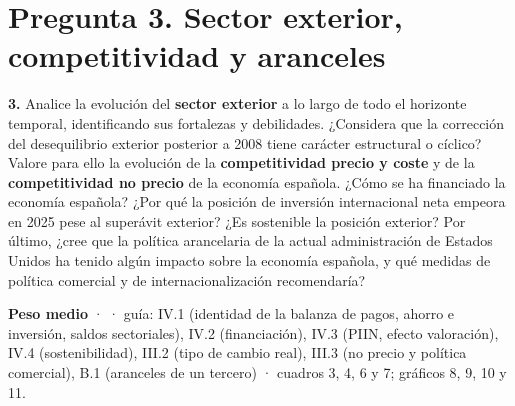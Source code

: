 \clearpage
\section*{Pregunta 3. Sector exterior, competitividad y aranceles}

\begin{enunciado}
\textbf{3.} Analice la evolución del \textbf{sector exterior} a lo largo de todo el horizonte temporal, identificando sus fortalezas y debilidades. ¿Considera que la corrección del desequilibrio exterior posterior a 2008 tiene carácter estructural o cíclico? Valore para ello la evolución de la \textbf{competitividad precio y coste} y de la \textbf{competitividad no precio} de la economía española. ¿Cómo se ha financiado la economía española? ¿Por qué la posición de inversión internacional neta empeora en 2025 pese al superávit exterior? ¿Es sostenible la posición exterior? Por último, ¿cree que la política arancelaria de la actual administración de Estados Unidos ha tenido algún impacto sobre la economía española, y qué medidas de política comercial y de internacionalización recomendaría?

\smallskip
\textbf{Peso medio} ·  · guía: IV.1 (identidad de la balanza de pagos, ahorro e inversión, saldos sectoriales), IV.2 (financiación), IV.3 (PIIN, efecto valoración), IV.4 (sostenibilidad), III.2 (tipo de cambio real), III.3 (no precio y política comercial), B.1 (aranceles de un tercero) · cuadros 3, 4, 6 y 7; gráficos 8, 9, 10 y 11.
\end{enunciado}

